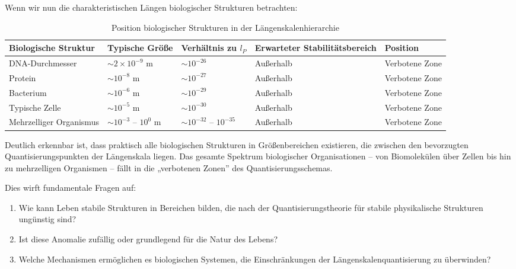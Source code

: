 \documentclass[12pt,a4paper]{article}
\begin{document}
	Wenn wir nun die charakteristischen Längen biologischer Strukturen betrachten:
	
	\begin{table}[h]
		\centering
		\begin{adjustbox}{scale=0.7}
			\begin{tabular}{lllll}
				\hline
				\textbf{Biologische Struktur} & \textbf{Typische Größe} & \textbf{Verhältnis zu $l_P$} & \textbf{Erwarteter Stabilitätsbereich} & \textbf{Position} \\
				\hline
				DNA-Durchmesser & $\sim 2 \times 10^{-9}$ m & $\sim 10^{-26}$ & Außerhalb & Verbotene Zone \\
				Protein & $\sim 10^{-8}$ m & $\sim 10^{-27}$ & Außerhalb & Verbotene Zone \\
				Bacterium & $\sim 10^{-6}$ m & $\sim 10^{-29}$ & Außerhalb & Verbotene Zone \\
				Typische Zelle & $\sim 10^{-5}$ m & $\sim 10^{-30}$ & Außerhalb & Verbotene Zone \\
				Mehrzelliger Organismus & $\sim 10^{-3}$ – $10^{0}$ m & $\sim 10^{-32}$ – $10^{-35}$ & Außerhalb & Verbotene Zone \\
				\hline
			\end{tabular}
		\end{adjustbox}
		\caption{Position biologischer Strukturen in der Längenskalenhierarchie}
		\label{tab:bio_structures}
	\end{table}
	
	Deutlich erkennbar ist, dass praktisch alle biologischen Strukturen in Größenbereichen existieren, die zwischen den bevorzugten Quantisierungspunkten der Längenskala liegen. Das gesamte Spektrum biologischer Organisationen – von Biomolekülen über Zellen bis hin zu mehrzelligen Organismen – fällt in die „verbotenen Zonen'' des Quantisierungsschemas.
	
	Dies wirft fundamentale Fragen auf:
	\begin{enumerate}
		\item Wie kann Leben stabile Strukturen in Bereichen bilden, die nach der Quantisierungstheorie für stabile physikalische Strukturen ungünstig sind?
		\item Ist diese Anomalie zufällig oder grundlegend für die Natur des Lebens?
		\item Welche Mechanismen ermöglichen es biologischen Systemen, die Einschränkungen der Längenskalenquantisierung zu überwinden?
	\end{enumerate}
	
\end{document}
